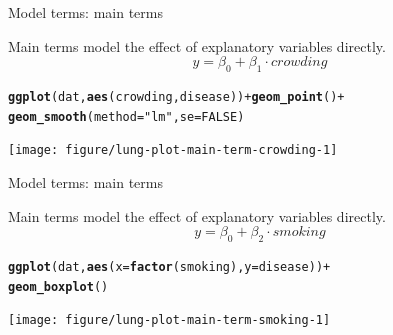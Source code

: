 \documentclass[table]{beamer}\usepackage[]{graphicx}\usepackage[]{color}
\makeatletter
\newcommand{\hlnum}[1]{\textcolor[rgb]{0.686,0.059,0.569}{#1}}%
\newcommand{\hlstr}[1]{\textcolor[rgb]{0.192,0.494,0.8}{#1}}%
\newcommand{\hlopt}[1]{\textcolor[rgb]{0,0,0}{#1}}%
\newcommand{\hlstd}[1]{\textcolor[rgb]{0.345,0.345,0.345}{#1}}%
\newcommand{\hlkwc}[1]{\textcolor[rgb]{0.333,0.667,0.333}{#1}}%
\newcommand{\hlkwd}[1]{\textcolor[rgb]{0.737,0.353,0.396}{\textbf{#1}}}%
\newenvironment{kframe}{%
 \def\at@end@of@kframe{}%
 \ifinner\ifhmode%
  \def\at@end@of@kframe{\end{minipage}}%
  \begin{minipage}{\columnwidth}%
 \fi\fi%
 \def\FrameCommand##1{\hskip\@totalleftmargin \hskip-\fboxsep
 \colorbox{shadecolor}{##1}\hskip-\fboxsep
     \hskip-\linewidth \hskip-\@totalleftmargin \hskip\columnwidth}%
 \MakeFramed {\advance\hsize-\width
   \@totalleftmargin\z@ \linewidth\hsize
   \@setminipage}}%
 {\par\unskip\endMakeFramed%
 \at@end@of@kframe}
\newenvironment{knitrout}{}{} %
\makeatother
\begin{document}
\begin{frame}[fragile]{Model terms: main terms}

Main terms model the effect of explanatory variables directly. $$y = \beta_0 + \beta_1 \cdot crowding $$

\begin{knitrout}\footnotesize
{}\color{fgcolor}\begin{kframe}
\begin{alltt}
\hlkwd{ggplot}\hlstd{(dat,} \hlkwd{aes}\hlstd{(crowding, disease))} \hlopt{+} \hlkwd{geom_point}\hlstd{()} \hlopt{+}
  \hlkwd{geom_smooth}\hlstd{(}\hlkwc{method}\hlstd{=}\hlstr{"lm"}\hlstd{,} \hlkwc{se}\hlstd{=}\hlnum{FALSE}\hlstd{)}
\end{alltt}
\end{kframe}
\texttt{[image: figure/lung-plot-main-term-crowding-1]} 

\end{knitrout}

\end{frame}


\begin{frame}[fragile]{Model terms: main terms}

Main terms model the effect of explanatory variables directly. $$y = \beta_0 + \beta_2 \cdot smoking$$

\begin{knitrout}\footnotesize
{}\color{fgcolor}\begin{kframe}
\begin{alltt}
\hlkwd{ggplot}\hlstd{(dat,} \hlkwd{aes}\hlstd{(}\hlkwc{x}\hlstd{=}\hlkwd{factor}\hlstd{(smoking),} \hlkwc{y}\hlstd{=disease))} \hlopt{+}
  \hlkwd{geom_boxplot}\hlstd{()}
\end{alltt}
\end{kframe}
\texttt{[image: figure/lung-plot-main-term-smoking-1]} 

\end{knitrout}

\end{frame}

\end{document}
